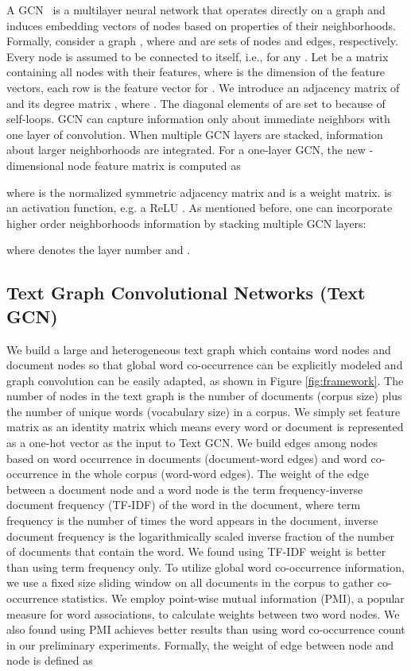 \documentclass[letterpaper]{article} \usepackage{aaai19}  \usepackage{times}  \usepackage{helvet}  \usepackage{courier}  \usepackage{url}  \usepackage{graphicx}  \frenchspacing  \usepackage{amsmath}
\begin{document}
A GCN~\cite{kipf2017semi} is a multilayer neural network that operates directly on a graph and induces embedding vectors of nodes based on properties of their neighborhoods. Formally, consider a graph , where  and  are sets of nodes and edges, respectively. Every node is assumed to be connected to itself, i.e.,  for any . Let  be a matrix containing all  nodes with their features, where  is the dimension of the feature vectors, each row  is the feature vector for . 
We introduce an adjacency matrix  of  and its degree matrix , where . The diagonal elements of  are set to  because of self-loops.
GCN can capture information only about immediate neighbors with one layer of convolution. When multiple GCN layers are stacked, information about larger neighborhoods are integrated. For a one-layer GCN, the new -dimensional node feature matrix  is computed as

where  is the normalized symmetric adjacency matrix and  is a weight matrix.  is an activation function, e.g. a ReLU . As mentioned before, one can incorporate higher order neighborhoods information by stacking multiple GCN layers:

where  denotes the layer number and .

\subsection{Text Graph Convolutional Networks (Text GCN)}
We build a large and heterogeneous text graph which contains word nodes and document nodes so that global word co-occurrence can be explicitly modeled and graph convolution can be easily adapted, as shown in Figure \ref{fig:framework}. The number of nodes in the text graph  is the number of documents (corpus size) plus the number of unique words (vocabulary size) in a corpus. We simply set feature matrix  as an identity matrix which means every word or document is represented as a one-hot vector as the input to Text GCN. We build edges among nodes based on word occurrence in documents (document-word edges) and word co-occurrence in the whole corpus (word-word edges).
The weight of the edge between a document node and a word node is the term frequency-inverse document frequency (TF-IDF) of the word in the document, where term frequency is the number of times the word appears in the document, inverse document frequency is the logarithmically scaled inverse fraction of the number of documents that contain the word. We found using TF-IDF weight is better than using term frequency only. To utilize global word co-occurrence information, we use a fixed size sliding window on all documents in the corpus to gather co-occurrence statistics. We employ point-wise mutual information (PMI), a popular measure for word associations, to calculate weights between two word nodes. We also found using PMI achieves better results than using word co-occurrence count in our preliminary experiments. Formally, the weight of edge between node  and node  is defined as
\end{document}
